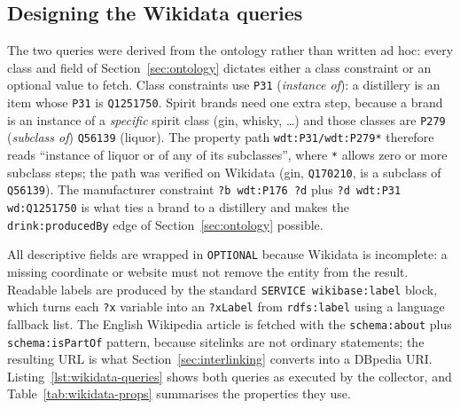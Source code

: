 \subsection{Designing the Wikidata queries}
\label{sec:wikidata-queries}

The two queries were derived from the ontology rather than written ad hoc:
every class and field of Section~\ref{sec:ontology} dictates either a class
constraint or an optional value to fetch. Class constraints use \texttt{P31}
(\emph{instance of}): a distillery is an item whose \texttt{P31} is
\texttt{Q1251750}. Spirit brands need one extra step, because a brand is an
instance of a \emph{specific} spirit class (gin, whisky, \dots) and those
classes are \texttt{P279} (\emph{subclass of}) \texttt{Q56139} (liquor). The
property path \texttt{wdt:P31/wdt:P279*} therefore reads ``instance of liquor
or of any of its subclasses'', where \texttt{*} allows zero or more subclass
steps; the path was verified on Wikidata (gin, \texttt{Q170210}, is a subclass
of \texttt{Q56139}). The manufacturer constraint \texttt{?b wdt:P176 ?d} plus
\texttt{?d wdt:P31 wd:Q1251750} is what ties a brand to a distillery and makes
the \texttt{drink:producedBy} edge of Section~\ref{sec:ontology} possible.

All descriptive fields are wrapped in \texttt{OPTIONAL} because Wikidata is
incomplete: a missing coordinate or website must not remove the entity from the
result. Readable labels are produced by the standard
\texttt{SERVICE wikibase:label} block, which turns each \texttt{?x} variable
into an \texttt{?xLabel} from \texttt{rdfs:label} using a language fallback
list. The English Wikipedia article is fetched with the \texttt{schema:about}
plus \texttt{schema:isPartOf} pattern, because sitelinks are not ordinary
statements; the resulting URL is what Section~\ref{sec:interlinking} converts
into a DBpedia URI. Listing~\ref{lst:wikidata-queries} shows both queries as
executed by the collector, and Table~\ref{tab:wikidata-props} summarises the
properties they use.

